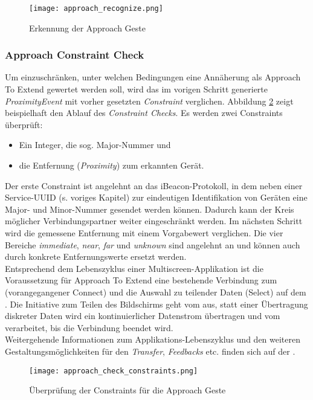 {\begin{figure}[h]
\texttt{[image: approach\_recognize.png]}
\caption{Erkennung der Approach Geste}
\label{recognize_approach}
\end{figure}

\subsubsection*{Approach Constraint Check}
Um einzuschränken, unter welchen Bedingungen eine Annäherung als Approach To Extend gewertet werden soll, wird das im vorigen Schritt generierte \textit{ProximityEvent} mit vorher gesetzten \textit{Constraint} verglichen. Abbildung \ref{check_approach_constraints} zeigt beispielhaft den Ablauf des \textit{Constraint Checks}. Es werden zwei Constraints überprüft:
\begin{itemize}
\item Ein Integer, die sog. Major-Nummer und
\item die Entfernung (\textit{Proximity}) zum erkannten Gerät.
\end{itemize}
Der erste Constraint ist angelehnt an das iBeacon-Protokoll, in dem neben einer Service-UUID (s. voriges Kapitel) zur eindeutigen Identifikation von Geräten eine Major- und Minor-Nummer gesendet werden können. Dadurch kann der Kreis möglicher Verbindungspartner weiter eingeschränkt werden.
Im nächsten Schritt wird die gemessene Entfernung mit einem Vorgabewert verglichen. Die vier Bereiche \textit{immediate}, \textit{near}, \textit{far} und \textit{unknown} sind angelehnt an \cite{Marquardt2015} und können auch durch konkrete Entfernungswerte ersetzt werden.\\

Entsprechend dem Lebenszyklus einer Multiscreen-Applikation ist die Voraussetzung
für Approach To Extend eine bestehende Verbindung zum \recdev{} (vorangegangener Connect) und die Auswahl zu teilender Daten (Select) auf dem \sendev{}. Die Initiative zum Teilen des Bildschirms geht vom \sendev{} aus, statt einer Übertragung diskreter Daten wird ein kontinuierlicher Datenstrom übertragen und vom \recdev{} verarbeitet, bis die Verbindung beendet wird.\\

Weitergehende Informationen zum Applikations-Lebenszyklus und den weiteren
Gestaltungsmöglichkeiten für den \textit{Transfer}, \textit{Feedbacks} etc. finden sich
auf der \developerpage.

\begin{figure}[h]
\texttt{[image: approach\_check\_constraints.png]}
\caption{Überprüfung der Constraints für die Approach Geste}
\label{check_approach_constraints}
\end{figure}
}

